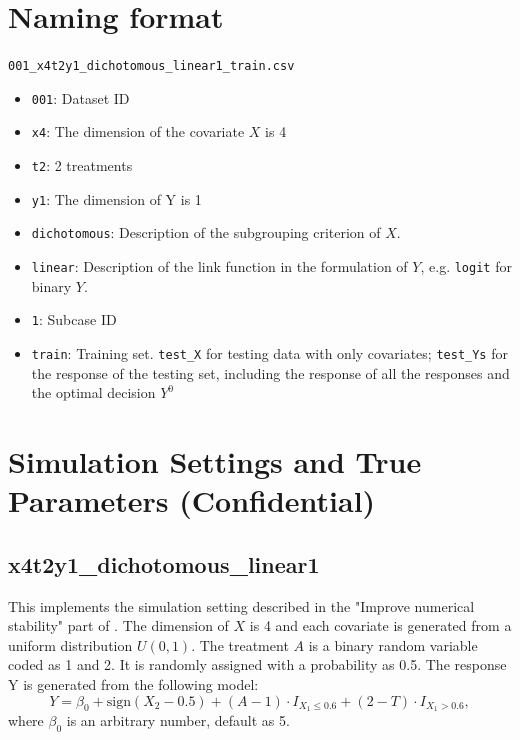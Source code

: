 \documentclass[12pt]{article}
\begin{document}
\section*{Naming format}
\texttt{001\_x4t2y1\_dichotomous\_linear1\_train.csv}
\begin{itemize}
	\item \texttt{001}: Dataset ID
	\item \texttt{x4}: The dimension of the covariate $X$ is 4
	\item \texttt{t2}: 2 treatments
	\item \texttt{y1}: The dimension of Y is 1
	\item \texttt{dichotomous}: Description of the subgrouping criterion of $X$.
	\item \texttt{linear}: Description of the link function in the formulation of $Y$, e.g. \texttt{logit} for binary $Y$.
	\item \texttt{1}: Subcase ID
	\item \texttt{train}: Training set. \texttt{test\_X} for testing data with only covariates; \texttt{test\_Ys} for the response of the testing set, including the response of all the responses and the optimal decision $Y^0$
\end{itemize}
\section*{Simulation Settings and True Parameters (Confidential)} \label{sec.SimSettings}

\subsection*{x4t2y1\_dichotomous\_linear1}
This implements the simulation setting described in the "Improve numerical stability" part of \cite{fu2016estimating}. The dimension of $X$ is 4 and each covariate is generated from a uniform distribution $U(0,1)$. The treatment $A$ is a binary random variable coded as 1 and 2. It is randomly assigned with a probability as 0.5. The response Y is generated from the following model:
\begin{equation*}
Y=\beta_0+\text{sign}(X_2-0.5)+(A-1)\cdot I_{X_1\le 0.6}+(2-T)\cdot I_{X_1>0.6},
\end{equation*} 
where $\beta_0$ is an arbitrary number, default as 5.
\end{document}
